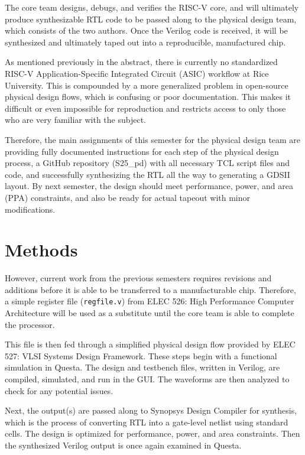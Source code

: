 \documentclass[conference]{IEEEtran}
\begin{document}
The core team designs, debugs, and verifies the RISC-V core, and will ultimately produce synthesizable RTL code to be passed along to the physical design team, which consists of the two authors. Once the Verilog code is received, it will be synthesized and ultimately taped out into a reproducible, manufactured chip.

As mentioned previously in the abstract, there is currently no standardized RISC-V Application-Specific Integrated Circuit (ASIC) workflow at Rice University. This is compounded by a more generalized problem in open-source physical design flows, which is confusing or poor documentation. This makes it difficult or even impossible for reproduction and restricts access to only those who are very familiar with the subject.

Therefore, the main assignments of this semester for the physical design team are providing fully documented instructions for each step of the physical design process, a GitHub repository (S25\_pd) with all necessary TCL script files and code, and successfully synthesizing the RTL all the way to generating a GDSII layout. By next semester, the design should meet performance, power, and area (PPA) constraints, and also be ready for actual tapeout with minor modifications.


\section{Methods}
However, current work from the previous semesters requires revisions and additions before it is able to be transferred to a manufacturable chip. Therefore, a simple register file (\texttt{regfile.v}) from ELEC 526: High Performance Computer Architecture will be used as a substitute until the core team is able to complete the processor.

This file is then fed through a simplified physical design flow provided by ELEC 527: VLSI Systems Design Framework. These steps begin with a functional simulation in Questa. The design and testbench files, written in Verilog, are compiled, simulated, and run in the GUI. The waveforms are then analyzed to check for any potential issues. 

Next, the output(s) are passed along to Synopsys Design Compiler for synthesis, which is the process of converting RTL into a gate-level netlist using standard cells. The design is optimized for performance, power, and area constraints. Then the synthesized Verilog output is once again examined in Questa.
\end{document}
